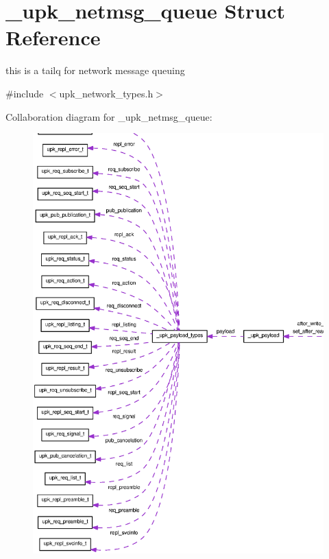 \section{\_\-upk\_\-netmsg\_\-queue Struct Reference}
\label{struct__upk__netmsg__queue}


this is a tailq for network message queuing  




{\ttfamily \#include $<$upk\_\-network\_\-types.h$>$}



Collaboration diagram for \_\-upk\_\-netmsg\_\-queue:\nopagebreak
\begin{figure}[H]
\begin{center}
\leavevmode
\includegraphics[width=400pt]{struct__upk__netmsg__queue__coll__graph}
\end{center}
\end{figure}
